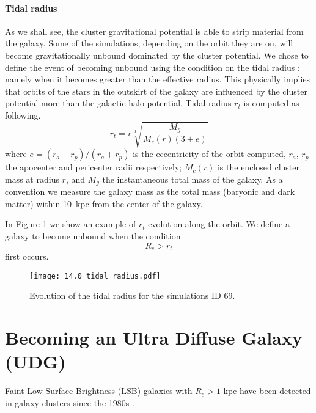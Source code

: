 \paragraph*{Tidal radius}
As we shall see, the cluster gravitational potential is able to strip material from the galaxy. Some of the simulations, depending on the orbit they are on, will become gravitationally unbound dominated by the cluster potential.
We chose to define the event of becoming unbound using the condition on the tidal radius \cite{King1962}: namely when it becomes greater than the effective radius.
This physically implies that orbits of the stars in the outskirt of the galaxy are influenced by the cluster potential more than the galactic halo potential. 
Tidal radius $r_t$ is computed as following.
\begin{equation}
r_t = r \sqrt[3]{\frac{M_g}{M_c(r) (3+e)}}
\label{eq:tidal_radius}
\end{equation}
where $e = (r_a - r_p) / (r_a + r_p)$ is the eccentricity of the orbit computed, $r_a$, $r_p$ the apocenter and pericenter radii respectively; $M_c(r)$ is the enclosed cluster mass at radius $r$, and $M_g$ the instantaneous total mass of the galaxy.
As a convention we measure the galaxy mass as the total mass (baryonic and dark matter) within 10~kpc from the center of the galaxy.

In Figure \ref{fig:tidal_radius} we show an example of $r_t$ evolution along the orbit.
We define a galaxy to become unbound when the condition 
\begin{equation}
    R_e > r_t
\label{eq:tidal_radius_condition}
\end{equation}
first occurs.
\begin{figure}
\centering
\texttt{[image: 14.0\_tidal\_radius.pdf]}
\caption{Evolution of the tidal radius for the simulations ID 69.}
\label{fig:tidal_radius}
\end{figure}

\section{Becoming an Ultra Diffuse Galaxy (UDG)}
\label{sec:UDG}

Faint Low Surface Brightness (LSB) galaxies with $R_e > 1$ kpc have been detected in galaxy clusters since the 1980s \citep[e.g.][]{Sandage1984}.

